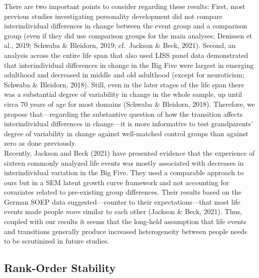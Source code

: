 \documentclass[
  english,
  man, noextraspace]{apa7}
\begin{document}
There are two important points to consider regarding these results: First, most previous studies investigating personality development did not compare interindividual differences in change between the event group and a comparison group (even if they did use comparison groups for the main analyses; Denissen et al., 2019; Schwaba \& Bleidorn, 2019; cf.~Jackson \& Beck, 2021). Second, an analysis across the entire life span that also used LISS panel data demonstrated that interindividual differences in change in the Big Five were largest in emerging adulthood and decreased in middle and old adulthood (except for neuroticism; Schwaba \& Bleidorn, 2018). Still, even in the later stages of the life span there was a substantial degree of variability in change in the whole sample, up until circa 70 years of age for most domains (Schwaba \& Bleidorn, 2018). Therefore, we propose that---regarding the substantive question of how the transition affects interindividual differences in change---it is more informative to test grandparents' degree of variability in change against well-matched control groups than against zero as done previously.\\
Recently, Jackson and Beck (2021) have presented evidence that the experience of sixteen commonly analyzed life events was mostly associated with decreases in interindividual variation in the Big Five. They used a comparable approach to ours but in a SEM latent growth curve framework and not accounting for covariates related to pre-existing group differences. Their results based on the German SOEP data suggested---counter to their expectations---that most life events made people \emph{more} similar to each other (Jackson \& Beck, 2021). Thus, coupled with our results it seems that the long-held assumption that life events and transitions generally produce increased heterogeneity between people needs to be scrutinized in future studies.

\hypertarget{rank-order-stability-1}{%
\subsection{Rank-Order Stability}\label{rank-order-stability-1}}
\end{document}
